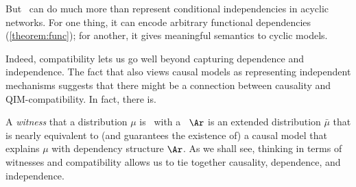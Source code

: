 But \scibility\ can do much more than represent conditional independencies in acyclic networks. 
%
%
For one thing, it can encode arbitrary 
    functional dependencies (\cref{theorem:func});
for another, it gives meaningful semantics to cyclic models.

%
%
Indeed, compatibility lets us go well beyond capturing dependence
and independence. The fact that \citet{pearl:2k} also views
causal models as representing independent mechanisms suggests that
there might be a connection between causality and
QIM-compatibility. In fact, there is.

A \emph{witness} that a distribution $\mu$ is \cible\ with a 
\hgraph\ $\Ar$ is an extended distribution $\bar\mu$ that 
is nearly equivalent to (and guarantees the existence of)
a causal model
that explains $\mu$ with dependency structure $\Ar$. 
As we shall see, thinking in terms of witnesses and compatibility
allows us to tie together causality, dependence, and independence.

